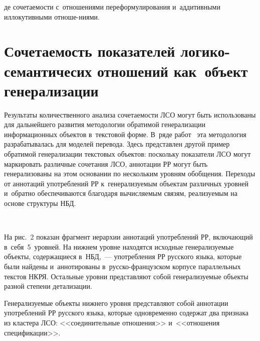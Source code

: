 \begin{multicols}{2}
\pagebreak

\noindent
де 
сочетаемости с~отношениями переформулирования и~аддитивными 
иллокутивными отноше-\linebreak ниями. 

  

\vspace*{-6pt}

\section{Сочетаемость показателей логико-семантичесих отношений 
как~объект генерализации}

  Результаты количественного анализа со\-че\-та\-емости ЛСО могут быть 
использованы для дальнейшего развития методологии обратимой 
генерализации информационных объектов в~текстовой форме. В~ряде 
работ~\cite{11-in, 12-in, 13-in} эта методология разрабатывалась для моделей 
перевода. Здесь представлен другой пример обратимой генерализации 
текстовых объектов: поскольку показатели ЛСО могут маркировать различные 
сочетания ЛСО, аннотации РР могут быть генерализованы на этом основании 
по нескольким уровням обобщения. Переходы от аннотаций употреблений РР 
к~генерализуемым объектам различных уровней и~обратно обеспечиваются 
благодаря вычисляемым связям, реализуемым на основе структуры НБД.

 \begin{figure*} %
 \vspace*{1pt}
    \begin{center}  
  \mbox{%
 \epsfxsize=152.447mm 
 }
 \end{center}
\vspace*{-9pt}
\end{figure*}
  
  На рис.~2 показан фрагмент иерархии аннотаций употреблений РР, 
включающий в~себя~5~уровней. На нижнем уровне находятся исходные\linebreak 
генерализуемые объекты, содержащиеся в~НБД,~--- упо\-треб\-ле\-ния РР русского 
языка, которые были найдены и~аннотированы в~рус\-ско-фран\-цуз\-ском 
корпусе параллельных текстов НКРЯ. Остальные уровни представляют собой 
генерализуемые объекты разной степени детализации. 
  



  Генерализуемые объекты нижнего уровня представляют собой аннотации 
употреблений РР русского языка, которые одновременно содержат два признака 
из кластера ЛСО: <<соединительные отношения>> и~<<отношения 
спецификации>>. 
  

\end{multicols}
